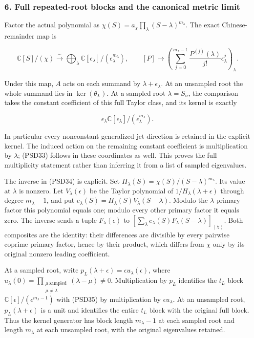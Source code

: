 \subsubsection{6. Full repeated-root blocks and the canonical metric limit}\label{full-repeated-root-blocks-and-the-canonical-metric-limit}

Factor the actual polynomial as \(\chi(S)=a_\chi\prod_\lambda(S-\lambda)^{m_\lambda}\). The exact Chinese-remainder map is

\[
\mathbb C[S]/(\chi)\xrightarrow{\sim}
\bigoplus_\lambda\mathbb C[\epsilon_\lambda]/(\epsilon_\lambda^{m_\lambda}),
\qquad
[P]\longmapsto
\left(\sum_{j=0}^{m_\lambda-1}\frac{P^{(j)}(\lambda)}{j!}\epsilon_\lambda^j\right)_\lambda.
\tag{PSD34}
\]

Under this map, \(A\) acts on each summand by \(\lambda+\epsilon_\lambda\). At an unsampled root the whole summand lies in \(\ker(\theta_L)\). At a sampled root \(\lambda=S_n\), the comparison takes the constant coefficient of this full Taylor class, and its kernel is exactly

\[
\epsilon_\lambda\mathbb C[\epsilon_\lambda]/(\epsilon_\lambda^{m_\lambda}).
\tag{PSD35}
\]

In particular every nonconstant generalized-jet direction is retained in the explicit kernel. The induced action on the remaining constant coefficient is multiplication by \(\lambda\); (PSD33) follows in these coordinates as well. This proves the full multiplicity statement rather than inferring it from a list of sampled eigenvalues.

The inverse in (PSD34) is explicit. Set \(H_\lambda(S)=\chi(S)/(S-\lambda)^{m_\lambda}\). Its value at \(\lambda\) is nonzero. Let \(V_\lambda(\epsilon)\) be the Taylor polynomial of \(1/H_\lambda(\lambda+\epsilon)\) through degree \(m_\lambda-1\), and put \(e_\lambda(S)=H_\lambda(S)V_\lambda(S-\lambda)\). Modulo the \(\lambda\) primary factor this polynomial equals one; modulo every other primary factor it equals zero. The inverse sends a tuple \(F_\lambda(\epsilon)\) to \(\left[\sum_\lambda e_\lambda(S)F_\lambda(S-\lambda)\right]_{(\chi)}\). Both composites are the identity: their differences are divisible by every pairwise coprime primary factor, hence by their product, which differs from \(\chi\) only by its original nonzero leading coefficient.

At a sampled root, write \(p_L(\lambda+\epsilon)=\epsilon u_\lambda(\epsilon)\), where \(u_\lambda(0)=\prod_{\substack{\mu\ \mathrm{sampled}\\\mu\ne\lambda}}(\lambda-\mu)\ne0\). Multiplication by \(p_L\) identifies the \(t_L\) block \(\mathbb C[\epsilon]/(\epsilon^{m_\lambda-1})\) with (PSD35) by multiplication by \(\epsilon u_\lambda\). At an unsampled root, \(p_L(\lambda+\epsilon)\) is a unit and identifies the entire \(t_L\) block with the original full block. Thus the kernel generator has block length \(m_\lambda-1\) at each sampled root and length \(m_\lambda\) at each unsampled root, with the original eigenvalues retained.

